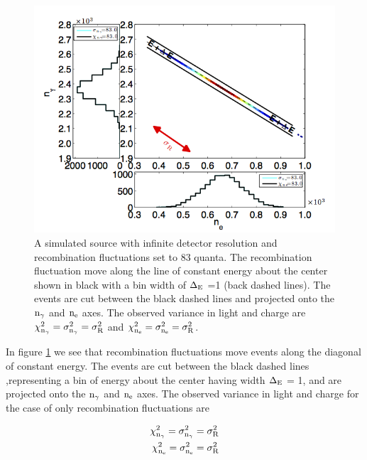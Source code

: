 \renewcommand{\baselinestretch}{1}
\small\normalsize
 \begin{figure}[h!]\centering
\includegraphics[width=160mm]{Chapter_Flucs/Figures/Ex_Plots/EX_R_Kr_.png}
\caption{A simulated \KrCal source with infinite detector resolution and recombination fluctuations set to 83 quanta. The recombination fluctuation move along the line of constant energy about the center shown in black with a bin width of $\rm \Delta_E$ =1 (back dashed lines). The events are cut between the black dashed lines and projected onto the $\rm n_\gamma$ and $\rm n_e$ axes. The observed variance in light and charge are $\rm \chi_{n_{\gamma}}^2 = \sigma_{n_{\gamma}}^2 = \sigma_{R}^2$ and $\rm \chi_{n_{e}}^2 = \sigma_{n_{e}}^2 = \sigma_{R}^2$.  }
\label{fig:Kr_ex_R}
\end{figure}
\renewcommand{\baselinestretch}{2}
\small\normalsize

\noindent In figure \ref{fig:Kr_ex_R} we see that recombination fluctuations move events along the diagonal of constant energy. The events are cut between the black dashed lines ,representing a bin of energy about the center having width $\rm \Delta_E$ = 1, and are projected onto the $\rm n_\gamma$ and $\rm n_e$ axes. The observed variance in light and charge for the case of only recombination fluctuations are 

\begin{equation}
\begin{split}
\rm \chi_{n_{\gamma}}^2 = \sigma_{n_{\gamma}}^2 = \sigma_{R}^2 \\
\rm \chi_{n_{e}}^2 = \sigma_{n_{e}}^2 = \sigma_{R}^2
\end{split}
\label{eq:Ex_R_only}
\end{equation}

